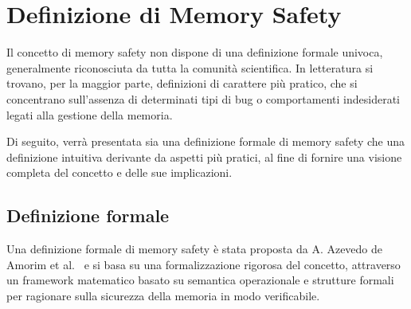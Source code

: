 \section{Definizione di Memory Safety}
\label{sec:memory_safety}

Il concetto di memory safety non dispone di una definizione formale univoca,
generalmente riconosciuta da tutta la comunità scientifica. In letteratura si trovano,
per la maggior parte, definizioni di carattere più pratico, che si concentrano
sull'assenza di determinati tipi di bug o comportamenti indesiderati legati alla
gestione della memoria.

Di seguito, verrà presentata sia una definizione formale di memory safety che una
definizione intuitiva derivante da aspetti più pratici, al fine di fornire una
visione completa del concetto e delle sue implicazioni.

\subsection{Definizione formale}
\label{sec:formal_definition}

Una definizione formale di memory safety è stata proposta da A. Azevedo de
Amorim et al.~\cite{meaning_memory_safety} e si basa su una formalizzazione rigorosa
del concetto, attraverso un framework matematico basato su semantica
operazionale e strutture formali per ragionare sulla sicurezza della memoria in
modo verificabile.

